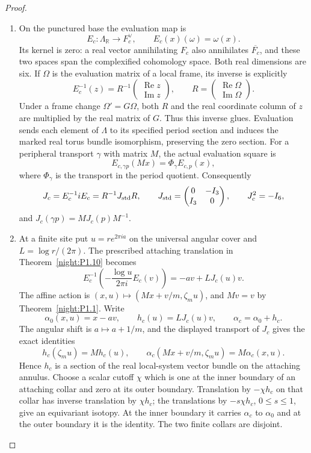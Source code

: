 \begin{proof}
\begin{enumerate}[label=\arabic*.]
\item On the punctured base the evaluation map is
\[
 E_c:\Lambda_{\mathbb R}\longrightarrow F_c^\vee,
 \qquad E_c(x)(\omega)=\omega(x).
\]
Its kernel is zero: a real vector annihilating $F_c$ also annihilates
$\overline{F_c}$, and these two spaces span the complexified cohomology
space. Both real dimensions are six. If $\Omega$ is the evaluation
matrix of a local frame, its inverse is explicitly
\[
 E_c^{-1}(z)=R^{-1}
       \begin{pmatrix}\operatorname{Re}z\\\operatorname{Im}z\end{pmatrix},
 \qquad
 R=\begin{pmatrix}\operatorname{Re}\Omega\\\operatorname{Im}\Omega\end{pmatrix}.
\]
Under a frame change $\Omega'=G\Omega$, both $R$ and the real coordinate
column of $z$ are multiplied by the real matrix of $G$. Thus this
inverse glues. Evaluation sends each element of $\Lambda$ to its
specified period section and induces the marked real torus bundle
isomorphism, preserving the zero section. For a peripheral transport
$\gamma$ with matrix $M$, the actual evaluation square is
\[
 E_{c,\gamma p}(Mx)=\Phi_\gamma E_{c,p}(x),
\]
where $\Phi_\gamma$ is the transport in the period quotient. Consequently
\[
 J_c=E_c^{-1}iE_c=R^{-1}J_{\rm std}R,
 \qquad
 J_{\rm std}=\begin{pmatrix}0&-I_3\\I_3&0\end{pmatrix},
 \qquad J_c^2=-I_6,
\]
and $J_c(\gamma p)=M J_c(p)M^{-1}$.

\item At a finite site put $u=r e^{2\pi ia}$ on the universal angular
cover and $L=\log r/(2\pi)$. The prescribed attaching translation in
Theorem~\ref{night:P1.10} becomes
\[
 E_c^{-1}\!\left(-\frac{\log u}{2\pi i}E_c(v)\right)
       =-av+LJ_c(u)v.
\]
The affine action is $(x,u)\mapsto(Mx+v/m,\zeta_m u)$, and $Mv=v$ by
Theorem~\ref{night:P1.1}. Write
\[
 \alpha_0(x,u)=x-av,
 \qquad h_c(u)=LJ_c(u)v,
 \qquad \alpha_c=\alpha_0+h_c.
\]
The angular shift is $a\mapsto a+1/m$, and the displayed transport of
$J_c$ gives the exact identities
\[
 h_c(\zeta_m u)=M h_c(u),\qquad
 \alpha_c(Mx+v/m,\zeta_m u)=M\alpha_c(x,u).
\]
Hence $h_c$ is a section of the real local-system vector bundle on
the attaching annulus. Choose a scalar cutoff $\chi$ which is one at
the inner boundary of an attaching collar and zero at its outer
boundary. Translation by $-\chi h_c$ on that collar has inverse
translation by $\chi h_c$; the translations by $-s\chi h_c$,
$0\leq s\leq1$, give an equivariant isotopy. At the inner boundary
it carries $\alpha_c$ to $\alpha_0$ and at the outer boundary it is
the identity. The two finite collars are disjoint.


\end{enumerate}
\end{proof}

